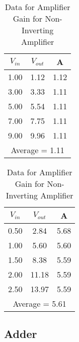 \documentclass[12pt]{article}
\begin{document}
\begin{table}[H]
  \begin{subtable}{0.48\textwidth}
    \centering
    \begin{tabular}{|c|c|c|}
        \hline
        $V_{in}$ & $V_{out}$ & A \\
        \hline
        1.00 & 1.12 & 1.12 \\
        3.00 & 3.33 & 1.11 \\
        5.00 & 5.54 & 1.11 \\
        7.00 & 7.75 & 1.11 \\
        9.00 & 9.96 & 1.11 \\
        \hline
        \multicolumn{3}{|c|}{Average = 1.11} \\
        \hline
    \end{tabular}
    \caption{$R_i=21800\Omega, R_f=2170\Omega$}
\end{subtable}
\hfill
\begin{subtable}{0.48\textwidth}
    \centering
    \begin{tabular}{|c|c|c|}
        \hline
        $V_{in}$ & $V_{out}$ & A \\
        \hline
        0.50 & 2.84 & 5.68 \\
        1.00 & 5.60 & 5.60 \\
        1.50 & 8.38 & 5.59 \\
        2.00 & 11.18 & 5.59 \\
        2.50 & 13.97 & 5.59 \\
        \hline
        \multicolumn{3}{|c|}{Average = 5.61} \\
        \hline
    \end{tabular}
    \caption{$R_i=2170\Omega, R_f=9850\Omega$}
\end{subtable}
  
  \caption{Data for Amplifier Gain for Non-Inverting Amplifier}
  \label{tab:combined2}
\end{table}

\subsection*{Adder}
\end{document}
